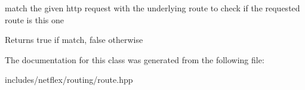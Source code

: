 match the given http request with the underlying route to check if the requested route is this one

\begin{DoxyReturn}{Returns}
true if match, false otherwise 
\end{DoxyReturn}


The documentation for this class was generated from the following file\+:\begin{DoxyCompactItemize}
\item 
includes/netflex/routing/route.\+hpp\end{DoxyCompactItemize}
